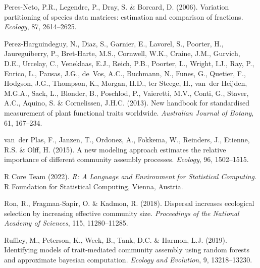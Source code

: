 \begin{thebibliography}{70}
	Peres-Neto, P.R., Legendre, P., Dray, S. \& Borcard, D. (2006).
	\newblock Variation partitioning of species data matrices: estimation and
	comparison of fractions.
	\newblock \emph{Ecology}, 87, 2614--2625.
	
	Perez-Harguindeguy, N., Diaz, S., Garnier, E., Lavorel, S., Poorter, H.,
	Jaureguiberry, P., Bret-Harte, M.S., Cornwell, W.K., Craine, J.M., Gurvich,
	D.E., Urcelay, C., Veneklaas, E.J., Reich, P.B., Poorter, L., Wright, I.J.,
	Ray, P., Enrico, L., Pausas, J.G., de~Vos, A.C., Buchmann, N., Funes, G.,
	Quetier, F., Hodgson, J.G., Thompson, K., Morgan, H.D., ter Steege, H.,
	van~der Heijden, M.G.A., Sack, L., Blonder, B., Poschlod, P., Vaieretti,
	M.V., Conti, G., Staver, A.C., Aquino, S. \& Cornelissen, J.H.C. (2013).
	\newblock New handbook for standardised measurement of plant functional traits
	worldwide.
	\newblock \emph{Australian Journal of Botany}, 61, 167--234.
	
	van~der Plas, F., Janzen, T., Ordonez, A., Fokkema, W., Reinders, J., Etienne,
	R.S. \& Olff, H. (2015).
	\newblock A new modeling approach estimates the relative importance of
	different community assembly processes.
	\newblock \emph{Ecology}, 96, 1502--1515.
	
	{R Core Team} (2022).
	\newblock \emph{R: A Language and Environment for Statistical Computing}.
	\newblock R Foundation for Statistical Computing, Vienna, Austria.
	
	Ron, R., Fragman-Sapir, O. \& Kadmon, R. (2018).
	\newblock Dispersal increases ecological selection by increasing effective
	community size.
	\newblock \emph{Proceedings of the National Academy of Sciences}, 115,
	11280--11285.
	
	Ruffley, M., Peterson, K., Week, B., Tank, D.C. \& Harmon, L.J. (2019).
	\newblock Identifying models of trait-mediated community assembly using random
	forests and approximate bayesian computation.
	\newblock \emph{Ecology and Evolution}, 9, 13218--13230.
	

\end{thebibliography}
